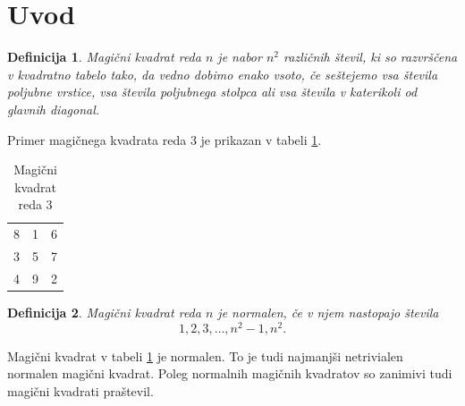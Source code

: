 \documentclass[a4paper,12pt]{article}
\newtheorem{definicija}{Definicija}
\newenvironment{magic}[3]{%
    \begin{table}[h]
    \centering
    \caption{#2}
    \label{#3}
    \begin{tabular}{|*{#1}{c|}}
    \hline
}
{%
    \\\hline
    \end{tabular}
    \end{table}
}
\newcommand{\pojem}[1]{\emph{\color{purple}#1}}
\begin{document}
\section{Uvod}



\begin{definicija}
   
      
            \pojem{Magični kvadrat} reda $n$ je nabor $n^2$ različnih števil,
            ki so razvrščena v kvadratno tabelo tako, da vedno dobimo enako vsoto,
            če seštejemo vsa števila poljubne vrstice, vsa števila poljubnega
            stolpca ali vsa števila v katerikoli od glavnih diagonal.
         
\end{definicija}


Primer magičnega kvadrata reda 3 je prikazan v tabeli \ref{table:mag3}.


   
\begin{magic}{3}{Magični kvadrat reda 3}{table:mag3}
      8 & 1 & 6 \\
     3 & 5 & 7 \\
      4 & 9 & 2 
\end{magic}

 \begin{definicija}
   Magični kvadrat reda $n$ je \pojem{normalen}, če v njem nastopajo števila
   \begin{equation}
      1, 2, 3, \ldots, n^2-1, n^2.
      \label{eq:numbers}
   \end{equation}
 \end{definicija}

Magični kvadrat v tabeli \ref{table:mag3} je normalen.
To je tudi najmanjši netrivialen normalen magični kvadrat.
Poleg normalnih magičnih kvadratov so zanimivi tudi magični kvadrati praštevil.
\end{document}
